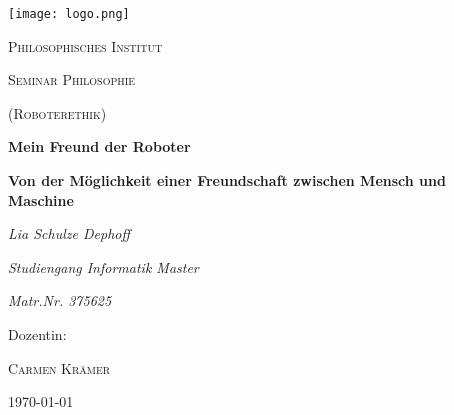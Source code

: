 \documentclass[12pt]{article}
\begin{document}
%
%
\begin{titlepage}
	\centering
	\texttt{[image: logo.png]}\par\vspace{1cm}
	{\scshape\LARGE Philosophisches Institut \par}
	\vspace{1cm}
	{\scshape\Large Seminar Philosophie\par}
	{\scshape\large (Roboterethik)\par}
	\vspace{1.5cm}
	{\huge\bfseries Mein Freund der Roboter\par}
	{\bfseries  \large Von der Möglichkeit einer Freundschaft zwischen Mensch und Maschine\par}
	\vspace{2cm}
	{\Large\itshape Lia Schulze Dephoff\par}
	{\itshape Studiengang Informatik Master\par}
	{\itshape Matr.Nr. 375625\par}
	\vfill
	Dozentin:\par
	\textsc{Carmen Krämer}

	\vfill

	{\large \today\par}
\end{titlepage}

%
%
\newpage
\tableofcontents 
\newpage
%
%
\end{document}

